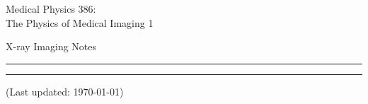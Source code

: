 \begin{titlepage}
  \centering
  \huge Medical Physics 386:\\ The Physics of Medical Imaging 1\par
  \huge X-ray Imaging Notes\par
  \vspace{1em}
  \hrule
  \makeatletter
  \renewcommand\tableofcontents{
  }
  {
    \normalsize \tableofcontents
  }
  \vspace{1em}
  \hrule
  \vspace{1em}
  \normalsize (Last updated: \today)\par
  
\end{titlepage}

